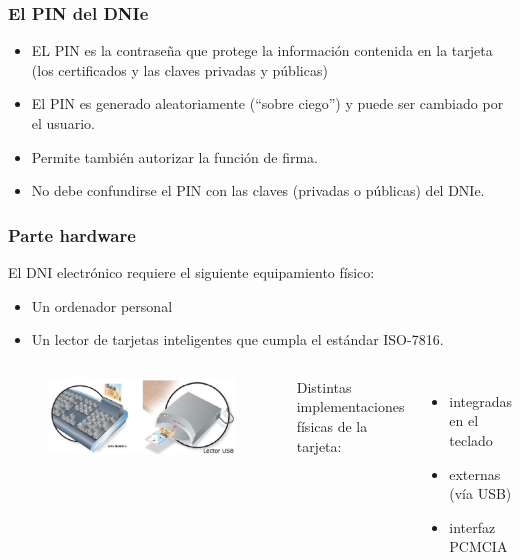 \documentclass{beamer}
\begin{document}
\begin{frame}
\frametitle{El PIN del DNIe}

\begin{itemize}
\item EL PIN es la contraseña que protege la información contenida en la tarjeta (los certificados y las claves privadas y públicas) 
\item El PIN es generado aleatoriamente (``sobre ciego'') y puede ser cambiado por el usuario.
\item Permite también autorizar la función de firma. 
\item No debe confundirse el PIN con las claves (privadas o públicas) del DNIe.
\end{itemize}

\end{frame}



\begin{frame}
\frametitle{Parte hardware}

El DNI electrónico requiere el siguiente equipamiento físico:

\begin{itemize}
\item Un ordenador personal
\item Un lector de tarjetas inteligentes que cumpla el estándar ISO-7816. 
\end{itemize}

\begin{columns}

\column[t]{4cm}

\begin{figure}
	\begin{flushleft}
	\includegraphics[scale=0.28,clip=true]{figs/lector_usb.jpg} 
	\end{flushleft}
\end{figure}

\column[t]{5cm}

Distintas implementaciones físicas de la tarjeta: 
	\begin{itemize}
	\item integradas en el teclado 
	\item externas (vía USB) 
	\item interfaz PCMCIA
	\end{itemize}

\end{columns}

\end{frame}
\end{document}
